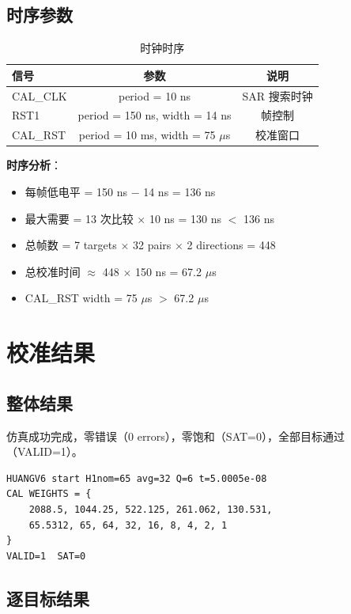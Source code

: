 \documentclass[12pt,a4paper]{article}
\begin{document}
\subsection{时序参数}
\begin{table}[H]
\centering
\caption{时钟时序}
\label{tab:timing}
\begin{tabular}{lcc}
\toprule
信号 & 参数 & 说明 \\
\midrule
CAL\_CLK & period = 10 ns & SAR 搜索时钟 \\
RST1 & period = 150 ns, width = 14 ns & 帧控制 \\
CAL\_RST & period = 10 ms, width = 75 $\mu$s & 校准窗口 \\
\bottomrule
\end{tabular}
\end{table}

\textbf{时序分析}：
\begin{itemize}
  \item 每帧低电平 = 150 ns $-$ 14 ns = 136 ns
  \item 最大需要 = 13 次比较 $\times$ 10 ns = 130 ns $<$ 136 ns \checkmark
  \item 总帧数 = 7 targets $\times$ 32 pairs $\times$ 2 directions = 448
  \item 总校准时间 $\approx$ 448 $\times$ 150 ns = 67.2 $\mu$s
  \item CAL\_RST width = 75 $\mu$s $>$ 67.2 $\mu$s \checkmark
\end{itemize}

\section{校准结果}

\subsection{整体结果}
仿真成功完成，零错误（0 errors），零饱和（SAT=0），全部目标通过（VALID=1）。

\begin{lstlisting}[caption={仿真最终输出}]
HUANGV6 start H1nom=65 avg=32 Q=6 t=5.0005e-08
CAL WEIGHTS = {
    2088.5, 1044.25, 522.125, 261.062, 130.531,
    65.5312, 65, 64, 32, 16, 8, 4, 2, 1
}
VALID=1  SAT=0
\end{lstlisting}

\subsection{逐目标结果}
\end{document}
